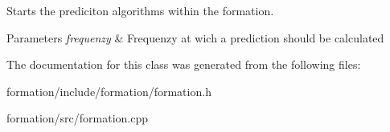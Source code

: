 Starts the prediciton algorithms within the formation. 


\begin{DoxyParams}{Parameters}
{\em frequenzy} & Frequenzy at wich a prediction should be calculated \\
\hline
\end{DoxyParams}


The documentation for this class was generated from the following files\+:\begin{DoxyCompactItemize}
\item 
formation/include/formation/formation.\+h\item 
formation/src/formation.\+cpp\end{DoxyCompactItemize}
